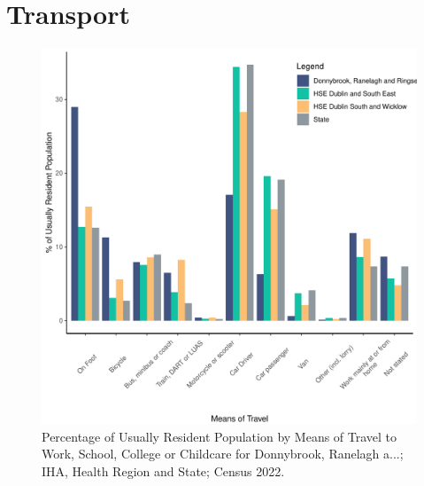 \documentclass{article}
\begin{document}
\section{Transport}\label{sect:Trans}
\begin{figure}[H]
	\centering
	\includegraphics[width = 120mm]{../figures/TravelED.pdf}
	\caption{Percentage of Usually Resident Population by Means of Travel to Work, School, College or Childcare for Donnybrook, Ranelagh a...; IHA, Health Region and State; Census 2022.}
	\label{fig:vbnv}
	\end{figure}
\end{document}
